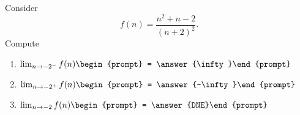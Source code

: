 \documentclass{ximera}
\author{Bart Snapp}
\begin{document}
\begin{exercise}
Consider 
\[
f(n) = \frac{n^2+n-2}{(n+2)^2}.
\]
Compute
\begin{enumerate}
\item $\lim_{n\to -2^- } f(n) \begin{prompt} = \answer{\infty}\end{prompt}$
\item $\lim_{n\to -2^+ } f(n) \begin{prompt} = \answer{-\infty}\end{prompt}$
\item $\lim_{n\to -2 } f(n) \begin{prompt} = \answer{DNE}\end{prompt}$
\end{enumerate}
\end{exercise}
\end{document}
